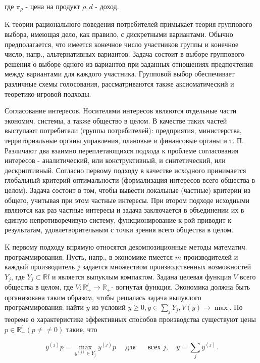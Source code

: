 \documentclass[10pt]{article}
\begin{document}
где $\pi_{\rho}$ - цена на продукт $\rho, d$ - доход.



$\mathrm{K}$ теории рационального поведения потребителей примыкает теория группового выбора, имеющая дело, как правило, с дискретными вариантами. Обычно предполагается, что имеется конечное число участников группы и конечное число, напр., альтернативных вариантов. Задача состоит в выборе группового решения о выборе одного из вариантов при заданных отношениях предпочтения между вариантами для каждого участника. Групповой выбор обеспечивает различные схемы голосования, рассматриваются также аксиоматический и теоретико-игровой подходы.



Согласование интересов. Носителями интересов являются отдельные части экономич. системы, а также общество в целом. В качестве таких частей выступают потребители (группы потребителей): предприятия, министерства, территориальные органы управления, плановые и финансовые органы и т. П. Различают два взаимно переплетающихся подхода к проблеме согласования интересов - аналитический, или конструктивный, и синтетический, или дескриптивный. Согласно первому подходу в качестве исходного принимается глобальный критерий оптимальности (формализация интересов всего общества в целом). Задача состоит в том, чтобы вывести локальные (частные) критерии из общего, учитывая при этом частные интересы. При втором подходе исходными являются как раз частные интереєы и задача заключается в объединении их в единую непротиворечивую систему, функционирование к-рой приводит к результатам, удовлетворительным с точки зрения всего общества в целом.



K первому подходу впрямую относятся декомпозиционные методы математич. программирования. Пусть, напр., в экономике пмеется $m$ производителей и каждый производитель $j$ задается множеством производственных возможностей $Y_{j}$, где $Y_{j} \subset \mathbb{R} l$ и является выпуклым компактом. Задана целевая функция $V$ всего общества в целом, где $V: \mathbb{R}_{+}^{l} \rightarrow \mathbb{R}_{+}$- вогнутая функция. Экономика должна быть организована таким образом, чтобы решалась задача выпуклого программирования: найти $\bar{y}$ из условий $y \geqslant 0, y \in \sum_{j} Y_{j}, V(y) \rightarrow \max$. По теореме о характеристике эффективных способов производства существуют цены $p \in \mathbb{R}_{+}^{l}(p \neq \neq 0)$ такие, что



\[

\bar{y}^{(j)} p=\max _{y^{(j)} \in Y_{j}} y^{(j)} p \quad \text { для } \quad \text { всех } j, \quad \bar{y}=\sum_{j} \bar{y}^{(j)} .

\]
\end{document}
